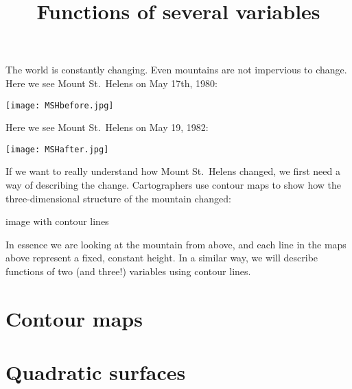 \documentclass{ximera}
\title[Dig-In:]{Functions of several variables}
\begin{document}
\begin{abstract}
\end{abstract}
\maketitle


The world is constantly changing. Even mountains are not impervious to
change.  Here we see Mount St.\ Helens on May 17th, 1980:
\begin{image}
  \texttt{[image: MSHbefore.jpg]}
\end{image}

Here we see Mount St.\ Helens on May 19, 1982:
\begin{image}
  \texttt{[image: MSHafter.jpg]}
\end{image}
If we want to really understand how Mount St.\ Helens changed, we
first need a way of describing the change. Cartographers use contour
maps to show how the three-dimensional structure of the mountain changed:
\begin{image}
image with contour lines
\end{image}
In essence we are looking at the mountain from above, and each line in
the maps above represent a fixed, constant height.  In a similar way,
we will describe functions of two (and three!)  variables using
contour lines.


\section{Contour maps}


\section{Quadratic surfaces}
\end{document}
